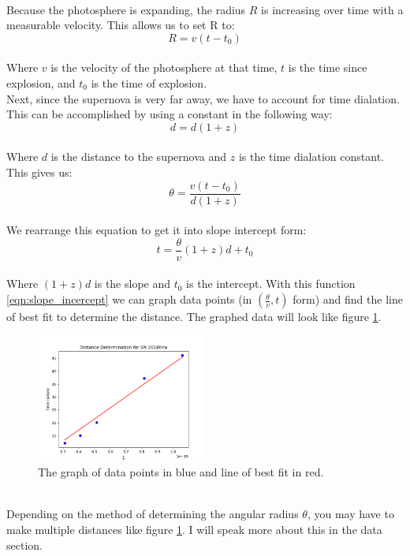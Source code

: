 \\
Because the photosphere is expanding, the radius $R$ is increasing over time with a measurable velocity. This allows us to set R to:
\\
\begin{equation}\label{eqn:radius}
    R = v(t-t_0)
\end{equation}
\\
Where $v$ is the velocity of the photosphere at that time, $t$ is the time since explosion, and $t_0$ is the time of explosion.
\\
Next, since the supernova is very far away, we have to account for time dialation. This can be accomplished by using a constant in the following way:
\\
\begin{equation}\label{eqn:distance}
    d = d(1+z)
\end{equation}
\\
Where $d$ is the distance to the supernova and $z$ is the time dialation constant.
\\
This gives us:
\\
\begin{equation}\label{eqn:pre_linear}
    \theta = \frac{v(t-t_0)}{d(1+z)}
\end{equation}
\\
We rearrange this equation to get it into slope intercept form:
\\
\begin{equation}\label{eqn:slope_incercept}
    t = \frac{\theta}{v}(1+z)d + t_0
\end{equation}
\\
Where $(1+z)d$ is the slope and $t_0$ is the intercept. With this function \ref{eqn:slope_incercept} 
we can graph data points (in $(\frac{\theta}{v}, t)$ form) and find the line of best fit to determine the distance.
The graphed data will look like figure \ref{fig:distance_graph}.
\\
\begin{figure} [h!]
    \begin{center}
    \includegraphics[width=0.5\textwidth]{Distance_Graph.png}
    \end{center}
    \label{fig:distance_graph}
    \caption{The graph of data points in blue and line of best fit in red.}    
\end{figure}
\\
Depending on the method of determining the angular radius $\theta$, you may have to make multiple distances 
like figure \ref{fig:distance_graph}. I will speak more about this in the data section.




